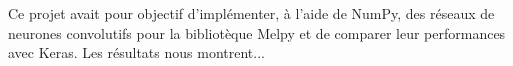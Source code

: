 Ce projet avait pour objectif d'implémenter, à l'aide de NumPy,
des réseaux de neurones convolutifs pour la bibliotèque Melpy et de comparer leur performances avec
Keras. Les résultats nous montrent...
